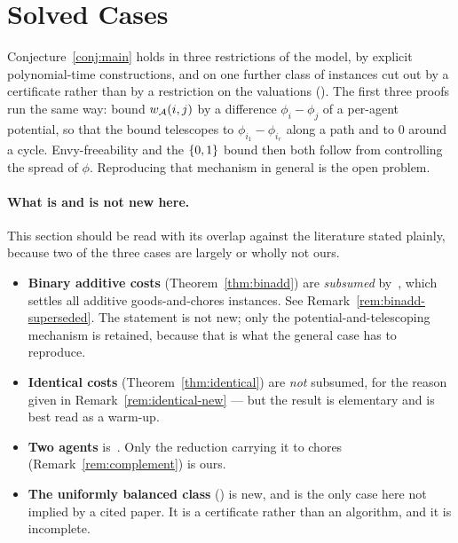 \section{Solved Cases}
\label{sec:solved}

Conjecture~\ref{conj:main} holds in three restrictions of the model, by explicit
polynomial-time constructions, and on one further class of instances cut out by
a certificate rather than by a restriction on the valuations
(). The first three proofs run the same way: bound
$w_{\mathcal{A}}(i,j)$ by a difference $\phi_i - \phi_j$ of a per-agent potential,
so that the bound telescopes to $\phi_{i_1} - \phi_{i_r}$ along a path and to
$0$ around a cycle. Envy-freeability and the $\left\{0,1\right\}$ bound then both follow
from controlling the spread of $\phi$. Reproducing that mechanism in general is
the open problem.

\paragraph{What is and is not new here.}
This section should be read with its overlap against the literature stated
plainly, because two of the three cases are largely or wholly not ours.

\begin{itemize}
  \item \textbf{Binary additive costs} (Theorem~\ref{thm:binadd}) are
    \emph{subsumed} by~\cite{LMS26}, which settles all additive goods-and-chores
    instances. See Remark~\ref{rem:binadd-superseded}. The statement is not new;
    only the potential-and-telescoping mechanism is retained, because that is
    what the general case has to reproduce.
  \item \textbf{Identical costs} (Theorem~\ref{thm:identical}) are \emph{not}
    subsumed, for the reason given in Remark~\ref{rem:identical-new} --- but the
    result is elementary and is best read as a warm-up.
  \item \textbf{Two agents} is~\cite[Theorem~4]{BKNS22}. Only the reduction
    carrying it to chores (Remark~\ref{rem:complement}) is ours.
  \item \textbf{The uniformly balanced class} () is new,
    and is the only case here not implied by a cited paper. It is a certificate
    rather than an algorithm, and it is incomplete.
\end{itemize}


